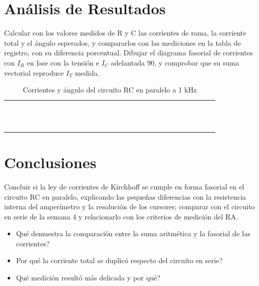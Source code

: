 \documentclass[12pt]{article}
\begin{document}
\section{Análisis de Resultados}\label{sec:analisis}
Calcular con los valores medidos de R y C las corrientes de rama, la corriente total y el ángulo esperados, y compararlos con las mediciones en la tabla de registro, con su diferencia porcentual.
\lineablanco
Dibujar el diagrama fasorial de corrientes con $I_R$ en fase con la tensión e $I_C$ adelantada 90\textdegree{}, y comprobar que su suma vectorial reproduce $I_T$ medida.
\begin{table}[H]
  \centering
  \caption{Corrientes y ángulo del circuito RC en paralelo a 1 kHz}
  \label{tab:registro-1}
  \begin{tabularx}{\linewidth}{>{\raggedright\arraybackslash}X>{\raggedright\arraybackslash}X>{\raggedright\arraybackslash}X>{\raggedright\arraybackslash}X>{\raggedright\arraybackslash}X}
    \rowcolor{iubnavy} \textcolor{white}{\textbf{Magnitud}} & \textcolor{white}{\textbf{Calculado}} & \textcolor{white}{\textbf{Medido}} & \textcolor{white}{\textbf{Unidad}} & \textcolor{white}{\textbf{Diferencia (\%)}} \\
    \rule{0pt}{0.8cm} & & & & \\
    \rowcolor{iubfondogris} \rule{0pt}{0.8cm} & & & & \\
    \rule{0pt}{0.8cm} & & & & \\
    \rowcolor{iubfondogris} \rule{0pt}{0.8cm} & & & & \\
    \rule{0pt}{0.8cm} & & & & \\
    \rowcolor{iubfondogris} \rule{0pt}{0.8cm} & & & & \\
    \rule{0pt}{0.8cm} & & & & \\
    \bottomrule
  \end{tabularx}
\end{table}

\section{Conclusiones}\label{sec:conclusiones}
Concluir si la ley de corrientes de Kirchhoff se cumple en forma fasorial en el circuito RC en paralelo, explicando las pequeñas diferencias con la resistencia interna del amperímetro y la resolución de los cursores; comparar con el circuito en serie de la semana 4 y relacionarlo con los criterios de medición del RA.
\lineablanco
\begin{itemize}
  \item \textquestiondown{}Qué demuestra la comparación entre la suma aritmética y la fasorial de las corrientes?
  \item \textquestiondown{}Por qué la corriente total se duplicó respecto del circuito en serie?
  \item \textquestiondown{}Qué medición resultó más delicada y por qué?
\end{itemize}
\end{document}
